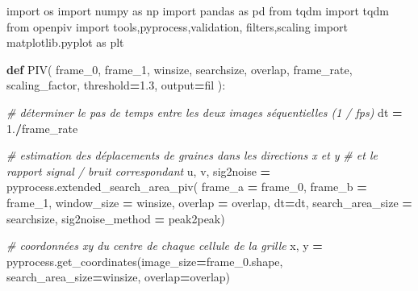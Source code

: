 \documentclass[
]{article}
\newenvironment{Shaded}{\begin{snugshade}}{\end{snugshade}}
\newcommand{\CommentTok}[1]{\textcolor[rgb]{0.56,0.35,0.01}{\textit{#1}}}
\newcommand{\FloatTok}[1]{\textcolor[rgb]{0.00,0.00,0.81}{#1}}
\newcommand{\ImportTok}[1]{#1}
\newcommand{\KeywordTok}[1]{\textcolor[rgb]{0.13,0.29,0.53}{\textbf{#1}}}
\newcommand{\NormalTok}[1]{#1}
\newcommand{\OperatorTok}[1]{\textcolor[rgb]{0.81,0.36,0.00}{\textbf{#1}}}
\newcommand{\StringTok}[1]{\textcolor[rgb]{0.31,0.60,0.02}{#1}}
\begin{document}
\begin{Shaded}
\begin{Highlighting}[]
\ImportTok{import}\NormalTok{ os}
\ImportTok{import}\NormalTok{ numpy }\ImportTok{as}\NormalTok{ np}
\ImportTok{import}\NormalTok{ pandas }\ImportTok{as}\NormalTok{ pd}
\ImportTok{from}\NormalTok{ tqdm }\ImportTok{import}\NormalTok{ tqdm}
\ImportTok{from}\NormalTok{ openpiv }\ImportTok{import}\NormalTok{ tools,pyprocess,validation, filters,scaling}
\ImportTok{import}\NormalTok{ matplotlib.pyplot }\ImportTok{as}\NormalTok{ plt}
\end{Highlighting}
\end{Shaded}

\begin{Shaded}
\begin{Highlighting}[]
\KeywordTok{def}\NormalTok{ PIV(}
\NormalTok{    frame\_0,}
\NormalTok{    frame\_1,}
\NormalTok{    winsize,}
\NormalTok{    searchsize,}
\NormalTok{    overlap,}
\NormalTok{    frame\_rate,}
\NormalTok{    scaling\_factor,}
\NormalTok{    threshold}\OperatorTok{=}\FloatTok{1.3}\NormalTok{,}
\NormalTok{    output}\OperatorTok{=}\StringTok{\textquotesingle{}fil\textquotesingle{}}\NormalTok{ ):}

    \CommentTok{\# déterminer le pas de temps entre les deux images séquentielles (1 / fps)}
\NormalTok{    dt }\OperatorTok{=} \FloatTok{1.}\OperatorTok{/}\NormalTok{frame\_rate}

    \CommentTok{\# estimation des déplacements de graines dans les directions x et y}
    \CommentTok{\# et le rapport signal / bruit correspondant}
\NormalTok{    u, v, sig2noise }\OperatorTok{=}\NormalTok{ pyprocess.extended\_search\_area\_piv(}
\NormalTok{                        frame\_a }\OperatorTok{=}\NormalTok{ frame\_0,}
\NormalTok{                        frame\_b }\OperatorTok{=}\NormalTok{ frame\_1,}
\NormalTok{                        window\_size }\OperatorTok{=}\NormalTok{ winsize,}
\NormalTok{                        overlap }\OperatorTok{=}\NormalTok{ overlap,}
\NormalTok{                        dt}\OperatorTok{=}\NormalTok{dt,}
\NormalTok{                        search\_area\_size }\OperatorTok{=}\NormalTok{ searchsize,      }
\NormalTok{                        sig2noise\_method }\OperatorTok{=} \StringTok{\textquotesingle{}peak2peak\textquotesingle{}}\NormalTok{)}

    \CommentTok{\# coordonnées xy du centre de chaque cellule de la grille}
\NormalTok{    x, y }\OperatorTok{=}\NormalTok{ pyprocess.get\_coordinates(image\_size}\OperatorTok{=}\NormalTok{frame\_0.shape,}
\NormalTok{                                     search\_area\_size}\OperatorTok{=}\NormalTok{winsize,}
\NormalTok{                                     overlap}\OperatorTok{=}\NormalTok{overlap)}


\end{Highlighting}
\end{Shaded}
\end{document}
